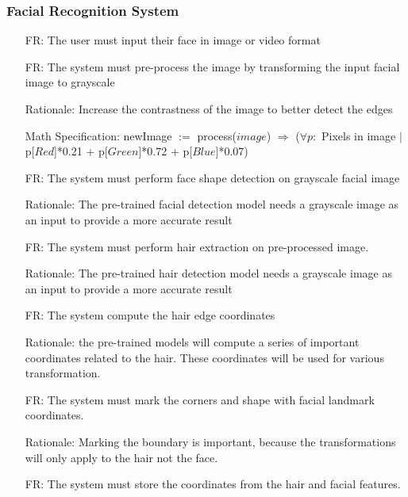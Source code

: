 \documentclass[12pt]{article}
\newcounter{reqnum} %
\newcounter{frreqnum} %
\begin{document}
\subsubsection{Facial Recognition System}
    \begin{itemize}
        \item[FR\refstepcounter{frreqnum}\thefrreqnum \label{R_Inputs}:] The user must input their face in image or video format
        \item[FR\refstepcounter{frreqnum}\thefrreqnum \label{R_Inputs}:] The system must pre-process the image by transforming the input facial image to grayscale
        \item[] Rationale: Increase the contrastness of the image to better detect the edges
        \item[] Math Specification: newImage $:=$ process($image$) $\Rightarrow$ ($\forall p :$ Pixels in image $|$ p[$Red$]*0.21 + p[$Green$]*0.72 + p[$Blue$]*0.07)
        \item[FR\refstepcounter{frreqnum}\thefrreqnum \label{R_Inputs}:] The system must perform face shape detection on grayscale facial image
        \item[] Rationale: The pre-trained facial detection model needs a grayscale image as an input to provide a more accurate result
        \item[FR\refstepcounter{frreqnum}\thefrreqnum \label{R_Inputs}:] The system must perform hair extraction on pre-processed image.
        \item[] Rationale: The pre-trained hair detection model needs a grayscale image as an input to provide a more accurate result
        \item[FR\refstepcounter{frreqnum}\thefrreqnum \label{R_Inputs}:] The system compute the hair edge coordinates
        \item[] Rationale: the pre-trained models will compute a series of important coordinates related to the hair. These coordinates will be used for various transformation.
        \item[FR\refstepcounter{frreqnum}\thefrreqnum \label{R_Inputs}:] The system must mark the corners and shape with facial landmark coordinates.
        \item[] Rationale: Marking the boundary is important, because the transformations will only apply to the hair not the face.
        \item[FR\refstepcounter{frreqnum}\thefrreqnum \label{R_Inputs}:] The system must store the coordinates from the hair and facial features.
    \end{itemize}
\end{document}
